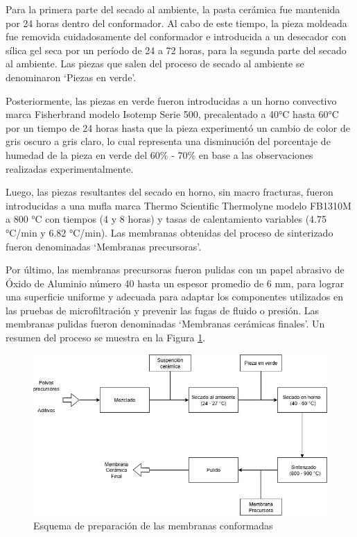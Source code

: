 \documentclass{article}
\begin{document}
Para la primera parte del secado al ambiente, la pasta cerámica fue mantenida por 24 horas dentro del conformador. Al cabo de este tiempo, la pieza moldeada fue removida cuidadosamente del conformador e introducida a un desecador con sílica gel seca por un período de 24 a 72 horas, para la segunda parte del secado al ambiente. Las piezas que salen del proceso de secado al ambiente se denominaron ‘Piezas en verde’.

Posteriormente, las piezas en verde fueron introducidas a un horno convectivo marca Fisherbrand modelo Isotemp Serie 500, precalentado a 40°C hasta 60°C por un tiempo de 24 horas hasta que la pieza experimentó un cambio de color de gris oscuro a gris claro, lo cual representa una disminución del porcentaje de humedad de la pieza en verde del 60\% - 70\% en base a las observaciones realizadas experimentalmente. 

Luego, las piezas resultantes del secado en horno, sin macro fracturas, fueron introducidas a una mufla marca Thermo Scientific Thermolyne modelo FB1310M a 800 °C con tiempos (4 y 8 horas) y tasas de calentamiento variables (4.75 °C/min y 6.82 °C/min). Las membranas obtenidas del proceso de sinterizado fueron denominadas ‘Membranas precursoras’.

Por último, las membranas precursoras fueron pulidas con un papel abrasivo de Óxido de Aluminio número 40 hasta un espesor promedio de 6 mm, para lograr una superficie uniforme y adecuada para adaptar los componentes utilizados en las pruebas de microfiltración y prevenir las fugas de fluido o presión. Las membranas pulidas fueron denominadas ‘Membranas cerámicas finales’. Un resumen del proceso se muestra en la Figura \ref{fig:Esq_PrepMembranas}.

\begin{figure}[ht]
    \centering
    \includegraphics[width=0.7\linewidth]{Esquema de preparacion de membranas ceramicas.jpg}
    \caption{Esquema de preparación de las membranas conformadas}
    \label{fig:Esq_PrepMembranas}
\end{figure}
\end{document}
